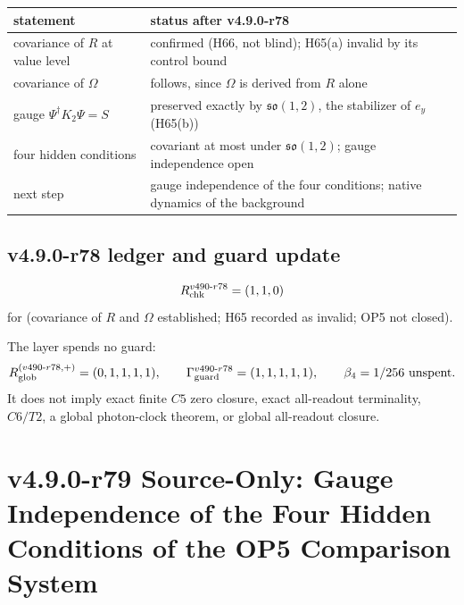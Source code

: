 \begin{center}
\small
\begin{tabular}{@{}>{\raggedright\arraybackslash}p{}>{\raggedright\arraybackslash}p{}@{}}
\toprule
statement & status after v4.9.0-r78\\
\midrule
covariance of \(R\) at value level & confirmed (H66, not blind); H65(a) invalid by its control bound\\
covariance of \(\Omega\) & follows, since \(\Omega\) is derived from \(R\) alone\\
gauge \(\Psi^\dagger K_2\Psi=S\) & preserved exactly by \(\mathfrak{so}(1,2)\), the stabilizer of \(e_y\) (H65(b))\\
four hidden conditions & covariant at most under \(\mathfrak{so}(1,2)\); gauge independence open\\
next step & gauge independence of the four conditions; native dynamics of the background\\
\bottomrule
\end{tabular}
\end{center}

\subsection*{v4.9.0-r78 ledger and guard update}
\label{subsec:v490-r78-ledger-guard}

\[
R_{\rm chk}^{v490\text{-}r78}=(1,1,0)
\]
for (covariance of \(R\) and \(\Omega\) established; H65 recorded as invalid; OP5 not closed).

The layer spends no guard:
\[
R_{\rm glob}^{(v490\text{-}r78,+)}=(0,1,1,1,1),
\qquad
\Gamma_{\rm guard}^{v490\text{-}r78}=(1,1,1,1,1),
\qquad
\beta_4=1/256\ \text{unspent}.
\]
It does not imply exact finite \(C5\) zero closure, exact all-readout terminality,
\(C6/T2\), a global photon-clock theorem, or global all-readout closure.

\clearpage
\section*{v4.9.0-r79 Source-Only: Gauge Independence of the Four Hidden Conditions of the OP5 Comparison System}
\label{sec:v490-r79-gauge-independence}

